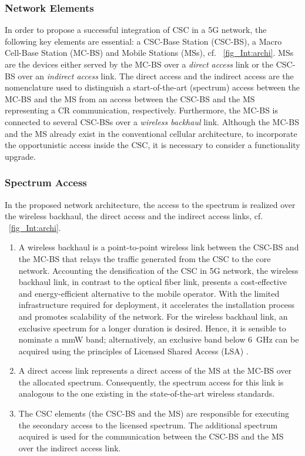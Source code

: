 \subsubsection*{Network Elements}
 In order to propose a successful integration of CSC in a 5G network, the following key elements are essential: a CSC-Base Station (CSC-BS), a Macro Cell-Base Station (MC-BS) and Mobile Stations (MSs), cf. \figurename~\ref{fig_Int:archi}. MSs are the devices either served by the MC-BS over a \textit{direct access} link or the CSC-BS over an \textit{indirect access} link. The direct access and the indirect access are the nomenclature used to distinguish a start-of-the-art (spectrum) access between the MC-BS and the MS from an access between the CSC-BS and the MS representing a CR communication, respectively. Furthermore, the MC-BS is connected to several CSC-BSs over a \textit{wireless backhaul} link. Although the MC-BS and the MS already exist in the conventional cellular architecture, to incorporate the opportunistic access inside the CSC, it is necessary to consider a functionality upgrade.

\subsubsection*{Spectrum Access}
In the proposed network architecture, the access to the spectrum is realized over the wireless backhaul, the direct access and the indirect access links, cf. \figurename~\ref{fig_Int:archi}.
\begin{enumerate}
\item A wireless backhaul is a
point-to-point wireless link between the CSC-BS and the MC-BS that relays the traffic generated from the CSC to the core network. Accounting the densification of the CSC in 5G network, the wireless backhaul link, in contrast to the optical fiber link, presents a cost-effective and energy-efficient alternative to the mobile operator.
With the limited infrastructure required for deployment, it accelerates the installation process and promotes scalability of the network.
For the wireless backhaul link, an exclusive spectrum for a longer duration is desired. Hence, it is sensible to nominate a mmW band; alternatively, an exclusive band below \SI{6}{GHz} can be acquired using the principles of Licensed Shared Access (LSA) \cite{ETSI13}.

\item A direct access link represents a direct access of the MS at the MC-BS over the allocated spectrum. Consequently, the spectrum access for this link is analogous to the one existing in the state-of-the-art wireless standards.
\item The CSC elements (the CSC-BS and the MS) are responsible for executing the secondary access to the licensed spectrum. The additional spectrum acquired is used for the communication between the CSC-BS and the MS over the indirect access link.
\end{enumerate}

